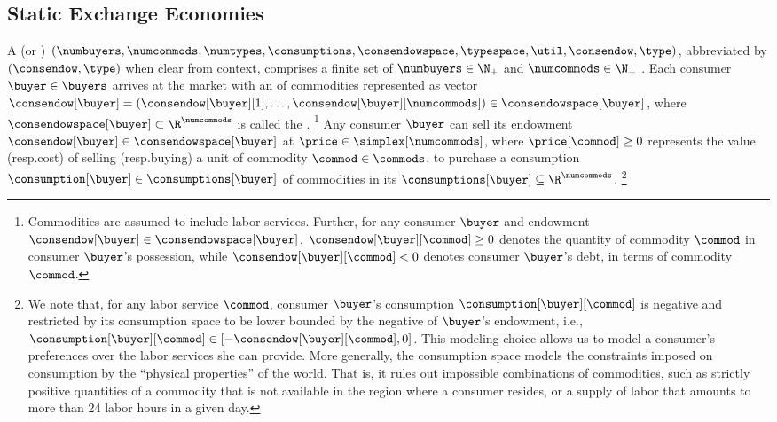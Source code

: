 

\subsection{Static Exchange Economies} 

A  (or )
$(\numbuyers, \numcommods, \numtypes, \consumptions, \consendowspace, \typespace, \util, \consendow, \type)$, abbreviated by $(\consendow, \type)$ when clear from context, comprises a finite set of $\numbuyers \in \N_+$  and  $\numcommods \in \N_+$ . 
Each consumer $\buyer \in \buyers$ arrives at the market with an  of commodities represented as vector $\consendow[\buyer] = \left(\consendow[\buyer][1], \dots, \consendow[\buyer][\numcommods] \right) \in \consendowspace[\buyer]$, where $\consendowspace[\buyer] \subset \R^\numcommods$ is called the .%
\footnote{Commodities are assumed to include labor services. 
Further, for any consumer $\buyer$ and endowment $\consendow[\buyer] \in \consendowspace[\buyer]$, $\consendow[\buyer][\commod] \geq 0$ denotes the quantity of commodity $\commod$ in consumer $\buyer$'s possession, while $\consendow[\buyer][\commod] < 0$ denotes consumer $\buyer$'s debt, in terms of commodity $\commod$.}
Any consumer $\buyer$ can sell its endowment $\consendow[\buyer] \in \consendowspace[\buyer]$ at  $\price \in \simplex[\numcommods]$, where $\price[\commod] \geq 0$ represents the value (resp.\@ cost) of selling (resp.\@ buying) a unit of commodity $\commod \in \commods$, to purchase a consumption $\consumption[\buyer] \in \consumptions[\buyer]$ of commodities in its  $\consumptions[\buyer] \subseteq \R^{\numcommods}$.%
\footnote{We note that, for any labor service $\commod$, consumer $\buyer$'s consumption $\consumption[\buyer][\commod]$ is negative and restricted by its consumption space to be lower bounded by the negative of $\buyer$'s endowment, i.e., $\consumption[\buyer][\commod] \in [- \consendow[\buyer][\commod], 0]$. 
This modeling choice allows us to model a consumer's preferences over the labor services she can provide. 
More generally, the consumption space models the constraints imposed on consumption by the ``physical properties'' of the world. 
That is, it rules out impossible combinations of commodities, such as strictly positive quantities of a commodity that is not available in the region where a consumer resides, or a supply of labor that amounts to more than 24 labor hours in a given day.}
